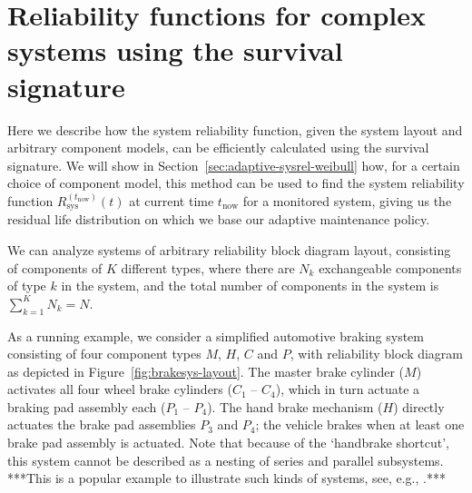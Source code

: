 \documentclass[authoryear]{elsarticle}
\def\tnow{t_\text{now}}
\newcommand{\Rsysnow}{R^{(t_\text{now})}_\text{sys}}
\begin{document}
\section{Reliability functions for complex systems using the survival signature}
\label{sec:sysrel}

Here we describe how the system reliability function, given the system layout and arbitrary component models,
can be efficiently calculated using the survival signature.
We will show in Section~\ref{sec:adaptive-sysrel-weibull} how, for a certain choice of component model,
this method can be used to find the system reliability function $\Rsysnow(t)$ at current time $\tnow$ for a monitored system,
giving us the residual life distribution on which we base our adaptive maintenance policy.

We can analyze systems of arbitrary reliability block diagram layout,
consisting of components of $K$ different types,
where there are $N_k$ exchangeable components of type $k$ in the system,
and the total number of components in the system is $\sum_{k=1}^K N_k = N$.

As a running example, we consider a simplified automotive braking system
consisting of four component types $M$, $H$, $C$ and $P$,
with reliability block diagram as depicted in Figure~\ref{fig:brakesys-layout}.
The master brake cylinder ($M$) activates all four wheel brake cylinders ($C_1$ -- $C_4$),
which in turn actuate a braking pad assembly each ($P_1$ -- $P_4$).
The hand brake mechanism ($H$) directly actuates the brake pad assemblies $P_3$ and $P_4$;
the vehicle brakes when at least one brake pad assembly is actuated.
Note that because of the `handbrake shortcut', this system cannot be described as a nesting of series and parallel subsystems.
***This is a popular example to illustrate such kinds of systems,
see, e.g., \cite[p.~***]{2010:ebeling}.***
\end{document}
